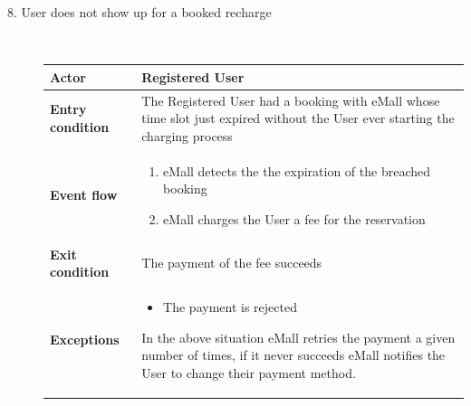 \documentclass[11pt]{article}
\begin{document}
\begin{description}
    \item [8. User does not show up for a booked recharge] \hfill \\
    \begin{table}[H]
        \centering
        \setlength{\tabcolsep}{18pt}
        \renewcommand{\arraystretch}{1.4}
        \begin{tabularx}{\textwidth}{|>{\hsize=0.5\hsize}X|>{\hsize=1.5\hsize}X|}
            \hline
            \textbf{Actor} & Registered User \\
            \hline
            \textbf{Entry condition} & The Registered User had a booking with eMall whose time slot just expired without the User ever starting the charging process \\
            \hline
            \textbf{Event flow} & 
                \begin{minipage}[t]{\hsize}
                \begin{enumerate}[topsep=0pt, leftmargin=*]
                    \item eMall detects the the expiration of the breached booking
                    \item eMall charges the User a fee for the reservation
                \end{enumerate}
                \end{minipage}
                \vspace{6pt}
            \\
            \hline
            \textbf{Exit condition} & The payment of the fee succeeds \\
            \hline
            \textbf{Exceptions} & 
                \begin{minipage}[t]{\hsize}
                \vspace{0pt}
                \begin{itemize}[topsep=0pt, leftmargin=*]
                    \item The payment is rejected
                \end{itemize}
                \vspace{8pt}
                \end{minipage}
                In the above situation eMall retries the payment a given number of times, if it never succeeds eMall notifies the User to change their payment method.
                \vspace{6pt}
            \\
            \hline
        \end{tabularx}
    \end{table}
    

\end{description}
\end{document}
